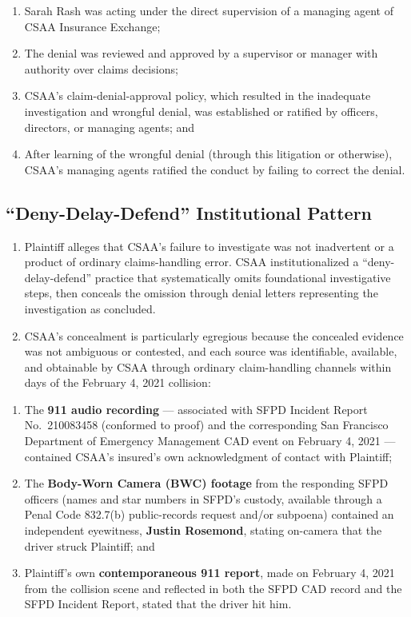 \begin{enumerate}
\def\labelenumi{(\alph{enumi})}
\item
  Sarah Rash was acting under the direct supervision of a managing agent of CSAA Insurance Exchange;
\item
  The denial was reviewed and approved by a supervisor or manager with authority over claims decisions;
\item
  CSAA's claim-denial-approval policy, which resulted in the inadequate investigation and wrongful denial, was established or ratified by officers, directors, or managing agents; and
\item
  After learning of the wrongful denial (through this litigation or otherwise), CSAA's managing agents ratified the conduct by failing to correct the denial.
\end{enumerate}

\subsection{``Deny-Delay-Defend'' Institutional Pattern}\label{deny-delay-defend-institutional-pattern}

\begin{enumerate}
\def\labelenumi{\arabic{enumi}.}
\setcounter{enumi}{27}
\item
  Plaintiff alleges that CSAA's failure to investigate was not inadvertent or a product of ordinary claims-handling error. CSAA institutionalized a ``deny-delay-defend'' practice that systematically omits foundational investigative steps, then conceals the omission through denial letters representing the investigation as concluded.
\item
  CSAA's concealment is particularly egregious because the concealed evidence was not ambiguous or contested, and each source was identifiable, available, and obtainable by CSAA through ordinary claim-handling channels within days of the February 4, 2021 collision:
\end{enumerate}

\begin{enumerate}
\def\labelenumi{(\alph{enumi})}
\item
  The \textbf{911 audio recording} --- associated with SFPD Incident Report No.~210083458 (conformed to proof) and the corresponding San Francisco Department of Emergency Management CAD event on February 4, 2021 --- contained CSAA's insured's own acknowledgment of contact with Plaintiff;
\item
  The \textbf{Body-Worn Camera (BWC) footage} from the responding SFPD officers (names and star numbers in SFPD's custody, available through a Penal Code \textsection{} 832.7(b) public-records request and/or subpoena) contained an independent eyewitness, \textbf{Justin Rosemond}, stating on-camera that the driver struck Plaintiff; and
\item
  Plaintiff's own \textbf{contemporaneous 911 report}, made on February 4, 2021 from the collision scene and reflected in both the SFPD CAD record and the SFPD Incident Report, stated that the driver hit him.
\end{enumerate}

